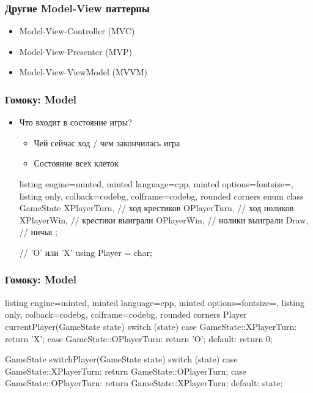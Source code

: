 \documentclass[10pt]{beamer}
\begin{document}
\begin{frame}[fragile]
\frametitle{Другие Model-View паттерны}
\begin{itemize}
\item Model-View-Controller (MVC)
\item Model-View-Presenter (MVP)
\item Model-View-ViewModel (MVVM)
\end{itemize}
\end{frame}

\begin{frame}[fragile]
\frametitle{Гомоку: Model}
\begin{itemize}
\item Что входит в состояние игры?
\pause
\begin{itemize}
\item Чей сейчас ход / чем закончилась игра
\pause
\item Состояние всех клеток
\end{itemize}
\pause
{}
\begin{tcblisting}{listing engine=minted, minted language=cpp, minted options={fontsize=\scriptsize}, listing only, colback=codebg, colframe=codebg, rounded corners}
enum class GameState {
  XPlayerTurn, // ход крестиков
  OPlayerTurn, // ход ноликов
  XPlayerWin,  // крестики выиграли
  OPlayerWin,  // нолики выиграли
  Draw,        // ничья
};

// 'O' или 'X'
using Player = char;
\end{tcblisting}
\end{itemize}
\end{frame}

\begin{frame}[fragile]
\frametitle{Гомоку: Model}
\begin{itemize}
\begin{tcblisting}{listing engine=minted, minted language=cpp, minted options={fontsize=\scriptsize}, listing only, colback=codebg, colframe=codebg, rounded corners}
Player currentPlayer(GameState state) {
  switch (state) {
    case GameState::XPlayerTurn: return 'X';
    case GameState::OPlayerTurn: return 'O';
    default: return 0;
  }
}

GameState switchPlayer(GameState state) {
  switch (state) {
    case GameState::XPlayerTurn: return GameState::OPlayerTurn;
    case GameState::OPlayerTurn: return GameState::XPlayerTurn;
    default: state;
  }
}
\end{tcblisting}
\end{itemize}
\end{frame}
\end{document}
